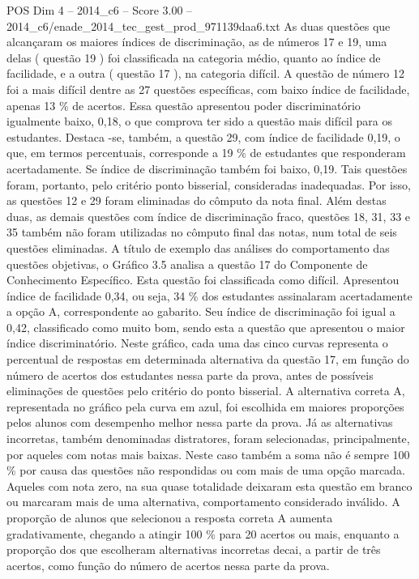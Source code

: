 \begin{textsample}{POS Dim 4 – 2014\_c6 – Score 3.00 – 2014\_c6/enade\_2014\_tec\_gest\_prod\_971139daa6.txt}
As duas questões que alcançaram os maiores índices de discriminação, as de números 17 e 19, uma delas ( questão 19 ) foi classificada na categoria médio, quanto ao índice de facilidade, e a outra ( questão 17 ), na categoria difícil.
A questão de número 12 foi a mais difícil dentre as 27 questões específicas, com baixo índice de facilidade, apenas 13 \% de acertos.
Essa questão apresentou poder discriminatório igualmente baixo, 0,18, o que comprova ter sido a questão mais difícil para os estudantes.
Destaca -se, também, a questão 29, com índice de facilidade 0,19, o que, em termos percentuais, corresponde a 19 \% de estudantes que responderam acertadamente.
Se índice de discriminação também foi baixo, 0,19.
Tais questões foram, portanto, pelo critério ponto bisserial, consideradas inadequadas.
Por isso, as questões 12 e 29 foram eliminadas do cômputo da nota final.
Além destas duas, as demais questões com índice de discriminação fraco, questões 18, 31, 33 e 35 também não foram utilizadas no cômputo final das notas, num total de seis questões eliminadas.
A título de exemplo das análises do comportamento das questões objetivas, o Gráfico 3.5 analisa a questão 17 do Componente de Conhecimento Específico.
Esta questão foi classificada como difícil.
Apresentou índice de facilidade 0,34, ou seja, 34 \% dos estudantes assinalaram acertadamente a opção A, correspondente ao gabarito.
Seu índice de discriminação foi igual a 0,42, classificado como muito bom, sendo esta a questão que apresentou o maior índice discriminatório.
Neste gráfico, cada uma das cinco curvas representa o percentual de respostas em determinada alternativa da questão 17, em função do número de acertos dos estudantes nessa parte da prova, antes de possíveis eliminações de questões pelo critério do ponto bisserial.
A alternativa correta A, representada no gráfico pela curva em azul, foi escolhida em maiores proporções pelos alunos com desempenho melhor nessa parte da prova.
Já as alternativas incorretas, também denominadas distratores, foram selecionadas, principalmente, por aqueles com notas mais baixas.
Neste caso também a soma não é sempre 100 \% por causa das questões não respondidas ou com mais de uma opção marcada.
Aqueles com nota zero, na sua quase totalidade deixaram esta questão em branco ou marcaram mais de uma alternativa, comportamento considerado inválido.
A proporção de alunos que selecionou a resposta correta A aumenta gradativamente, chegando a atingir 100 \% para 20 acertos ou mais, enquanto a proporção dos que escolheram alternativas incorretas decai, a partir de três acertos, como função do número de acertos nessa parte da prova.

\end{textsample}
